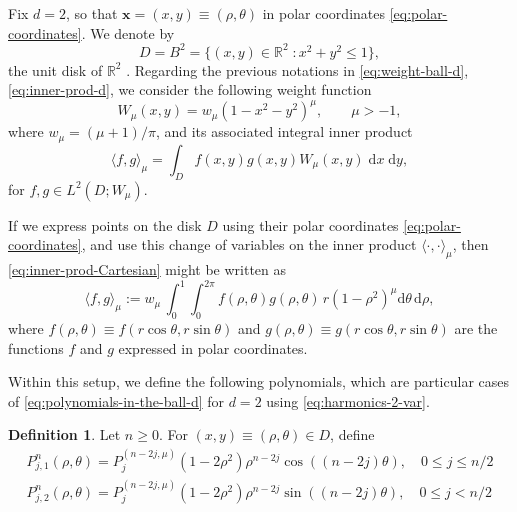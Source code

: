 \documentclass[a4paper]{article}
\theoremstyle{plain}
\theoremstyle{definition}
\newtheorem{definition}[theorem]{Definition}
\newcommand{\RR}{\mathbb{R}}
\newcommand{\dr}{\mathrm{d}}
\newcommand{\dxdy}{\;\mathrm{d} x\;\mathrm{d} y}
\newcommand{\innerprod}[2]{\langle #1 , #2 \rangle}
\begin{document}
    Fix $d=2$, so that $\mathbf x = (x,y)\equiv (\rho,\theta)$ in polar coordinates \eqref{eq:polar-coordinates}. We denote by 
    \begin{equation}
        \label{eq:disk}
        D =B^2= \{(x,y)\in\RR^2\; : x^2+y^2\leq 1 \},
    \end{equation}
    the unit disk of $\RR^2$  \cite[Section 2.3]{DX14}. Regarding the previous notations in \eqref{eq:weight-ball-d}, \eqref{eq:inner-prod-d}, we consider the following weight function 
    \begin{equation}
        \label{eq:weight-disk}
        W_{\mu}(x,y)=w_\mu (1-x^2-y^2)^\mu,  \qquad \mu>-1,
    \end{equation}
    where $w_\mu=(\mu+1)/\pi$, and its associated integral inner product
    \begin{equation}\label{eq:inner-prod-Cartesian}
        \innerprod{f}{g}_\mu=\int_D f(x,y)g(x,y)W_\mu(x,y)\dxdy, 
    \end{equation}
    for $f,g\in L^2(D;W_\mu)$. 
           
    If we express points on the disk $D$ using their polar coordinates \eqref{eq:polar-coordinates}, and use this change of variables on the inner product $\innerprod{\cdot}{\cdot}_\mu$, then \eqref{eq:inner-prod-Cartesian} might be written as
    \begin{equation}
    \label{eq:inner-prod-polar}
        \innerprod{f}{g}_\mu:=w_\mu\,\int_0^1 \int_0^{2\pi} f(\rho,\theta) g(\rho,\theta)\, r(1-\rho^2)^\mu\dr\theta\,\dr \rho,
    \end{equation}
    where $f(\rho,\theta)\equiv f(r\cos\theta,r\sin\theta)$ and $ g(\rho,\theta)\equiv g(r\cos\theta,r\sin\theta)$ are the functions $f$ and $g$ expressed in polar coordinates.

    Within this setup, we define the following polynomials, which are particular cases of \eqref{eq:polynomials-in-the-ball-d} for $d=2$ using \eqref{eq:harmonics-2-var}. 
    \begin{definition}
        Let $n\geq 0$. For $(x,y)\equiv (\rho,\theta) \in D$, define 
        \begin{equation}
        \label{eq:OP-disk}
        \begin{aligned}
            P^n_{j,1}(\rho,\theta) = P_j^{(n-2j,\mu)}(1-2\rho^2)\rho^{n-2j}\cos((n-2j)\theta), \quad 0\leq j \leq n/2
            \\
            P^n_{j,2}(\rho,\theta) = P_j^{(n-2j,\mu)}(1-2\rho^2)\rho^{n-2j}\sin((n-2j)\theta), \quad 0\leq j < n/2
        \end{aligned}
        \end{equation}
    \end{definition}
    
\end{document}
